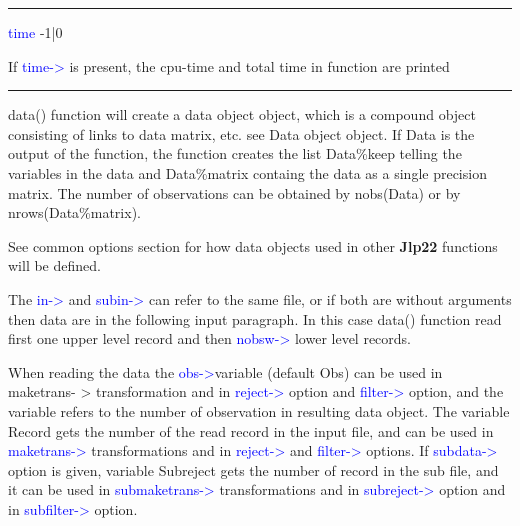 \vspace{0.3cm}
\hrule
\vspace{0.3cm}
\noindent \textcolor{blue}{time} \tabto{3cm} -1|0 \tabto{5cm}   \tabto{7cm}
\begin{changemargin}{3cm}{0cm}
\noindent  If \textcolor{blue}{time->} is present, the cpu-time and total time in function are printed

\end {changemargin}
\hrule
\vspace{0.2cm}

\begin{note}
\textcolor{VioletRed}{data}() function will create a data object object, which is a compound object consisting
of links to data matrix, etc. see Data object object. If Data is the output
of the function, the function creates the list Data\%keep telling the
variables in the data and
Data\%matrix containg the data as a single precision matrix. The number of observations can be obtained by \textcolor{VioletRed}{nobs}(Data) or by
\textcolor{VioletRed}{nrows}(Data\%matrix).
\end{note}
\begin{note}
See common options section for how data objects used in other \textbf{Jlp22} functions will be defined.
\end{note}
\begin{note}
The \textcolor{blue}{in->} and \textcolor{blue}{subin->} can refer to the same file, or if both are without arguments
then data are in the following input paragraph. In this case \textcolor{VioletRed}{data}() function read first one
upper level record and then \textcolor{blue}{nobsw->} lower level records.
\end{note}
\begin{note}
When reading the data the \textcolor{blue}{obs->}variable (default Obs) can be used in maketrans-
> transformation and in \textcolor{blue}{reject->} option and \textcolor{blue}{filter->} option, and the variable refers to
the number of observation in resulting data object. The variable Record gets the number of
the read record in the input file, and can be used in \textcolor{blue}{maketrans->} transformations and in
\textcolor{blue}{reject->} and \textcolor{blue}{filter->} options. If \textcolor{blue}{subdata->} option is given, variable Subreject gets
the number of record in the sub file, and it can be used in \textcolor{blue}{submaketrans->} transformations
and in \textcolor{blue}{subreject->} option and in \textcolor{blue}{subfilter->} option.
\end{note}
